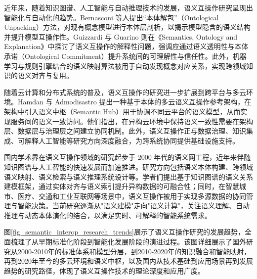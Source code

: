 近年来，随着知识图谱、人工智能与自动推理技术的发展，语义互操作研究呈现出智能化与自动化的趋势。Bernasconi 等人提出“本体解包”（Ontological Unpacking）方法，对现有概念模型进行本体层剖析，以揭示模型隐含的语义结构并提升模型互操作性\cite{Bernasconi2022Ontological}。Guizzardi 与 Guarino 则在《Semantics, Ontology and Explanation》中探讨了语义互操作的解释性问题，强调应通过语义透明性与本体承诺（Ontological Commitment）提升系统间的可理解性与信任性\cite{Guizzardi2023Explanation}。此外，机器学习与规则引擎结合的语义映射算法被用于自动发现概念对应关系，实现跨领域知识的语义对齐与复用。

随着云计算和分布式系统的普及，语义互操作的研究进一步扩展到跨平台与多云环境。Hamdan 与 Admodisastro 提出一种基于本体的多云语义互操作参考架构，在架构中引入语义中枢（Semantic Hub）用于协调不同云平台的语义模型，从而实现服务间的语义一致访问\cite{Hamdan2023Reference,Hamdan2024SemanticMultiCloud}。他们指出，在异构云环境中保持语义一致性需要在架构层、数据层与治理层之间建立协同机制。此外，语义互操作正与数据治理、知识集成、可解释人工智能等研究方向深度融合，为跨系统协同提供基础设施支持。

国内学术界在语义互操作领域的研究起步于 2000 年代的语义网工程，近年来伴随知识图谱与人工智能的快速发展而加速推进。研究方向包括语义本体构建、跨领域语义映射、语义检索与语义推理系统设计等。学者们提出基于知识图谱的语义关系建模框架，通过实体对齐与语义索引提升异构数据的可融合性；同时，在智慧城市、医疗、交通和工业互联网等场景中，语义互操作被用于实现多源数据的协同管理与智能决策。当前研究逐渐从"语义建模"走向"语义计算"，关注语义理解、自动推理与动态本体演化的结合，以满足实时、可解释的智能系统需求。

图\ref{fig_semantic_interop_research_trends}展示了语义互操作研究的发展趋势，全面梳理了从早期标准化阶段到智能化发展阶段的演进过程。该图详细展示了国外研究从2000-2010年的标准体系和模型分层，到2010-2020年的知识融合和智能映射，再到2020年至今的多云环境和语义中枢，以及国内从技术基础到应用场景再到发展趋势的研究路径，体现了语义互操作技术的理论深度和应用广度。

